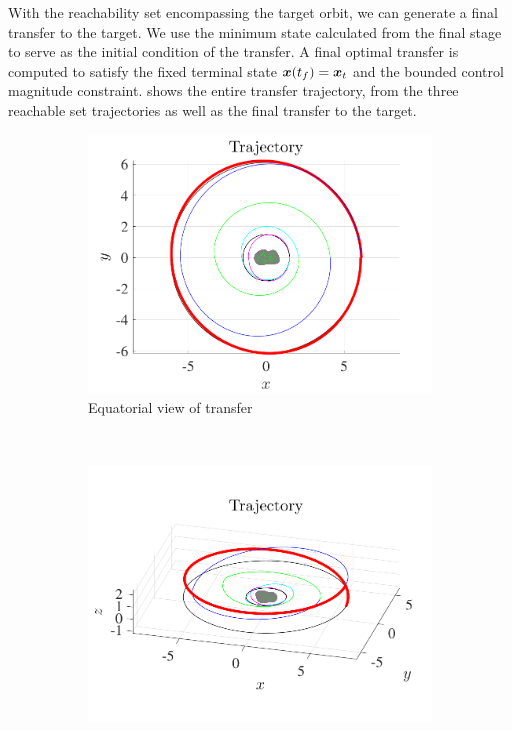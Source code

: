 \documentclass[]{aiaa-tc}%
\begin{document}
With the reachability set encompassing the target orbit, we can generate a final transfer to the target.
We use the minimum state calculated from the final stage to serve as the initial condition of the transfer.
A final optimal transfer is computed to satisfy the fixed terminal state \( \bm{x}(t_f) = \bm{x}_t \) and the bounded control magnitude constraint.
 shows the entire transfer trajectory, from the three reachable set trajectories as well as the final transfer to the target.
\begin{figure}[htbp] 
    \centering 
    \begin{subfigure}[htbp]{0.45\textwidth} 
        \includegraphics[width=\textwidth]{figures/trajectory.pdf} 
        \caption{Equatorial view of transfer} \label{fig:trajectory_up} 
    \end{subfigure}~ %
    \begin{subfigure}[htbp]{0.45\textwidth} 
        \includegraphics[width=\textwidth]{figures/trajectory_3d.pdf} 

\end{subfigure}
\end{figure}
\end{document}
